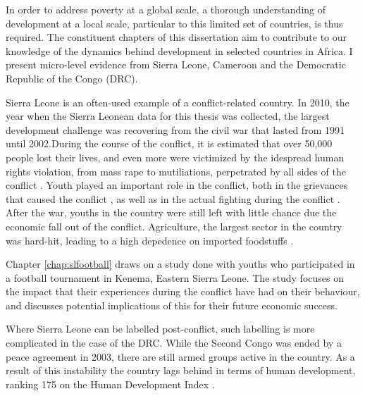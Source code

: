 In order to address poverty at a global scale, a thorough understanding of development at a local scale, particular to this limited set of countries, is thus required. The constituent chapters of this dissertation aim to contribute to our knowledge of the dynamics behind development in selected countries in Africa. I present micro-level evidence from Sierra Leone, Cameroon and the Democratic Republic of the Congo (DRC). %

Sierra Leone is an often-used example of a conflict-related country. In 2010, the year when the Sierra Leonean data for this thesis was collected, the largest development challenge was recovering from the civil war that lasted from 1991 until 2002.During the course of the conflict, it is estimated that over 50,000 people lost their lives, and even more were victimized by the idespread human rights violation, from mass rape to mutiliations, perpetrated by all sides of the conflict \citep{HumanRightsWatch1999a}. Youth played an important role in the conflict, both in the grievances that caused the conflict \citep[see e.g.][]{Peters1998,Richards2005,Peters2011}, as well as in the actual fighting during the conflict \citep{Humphreys2013}. After the war, youths in the country were still left with little chance due the economic fall out of the conflict.  Agriculture, the largest sector in the country was hard-hit, leading to a high depedence on imported foodstuffs \citep{FAO2005}. 

 Chapter \ref{chap:slfootball} draws on a study done with youths who participated in a football tournament in Kenema, Eastern Sierra Leone. The study focuses on the impact that their experiences during the conflict have had on their behaviour, and discusses potential implications of this for their future economic success. 

Where Sierra Leone can be labelled post-conflict, such labelling is more complicated in the case of the DRC. While the Second Congo was ended by a peace agreement in 2003, there are still armed groups active in the country. As a result of this instability the country lags behind in terms of human development, ranking 175 on the Human Development Index \citep{UNDP2020a}. 



